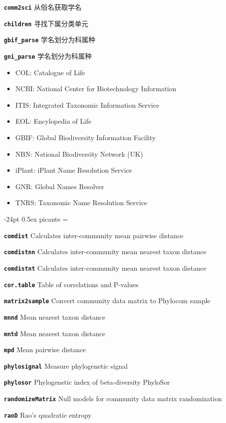 \documentclass[10pt,landscape]{article}
\makeatletter
\renewcommand\section{\@startsection{section}{1}{0mm}%
                                     {-24pt}%
                                     {0.5ex}%
                                {\color{blue}\normalfont\large\bfseries}}
\newcommand{\bcode}[1]{\texttt{\textbf{#1}}}
\makeatother
\begin{document}
\begin{CJK}{UTF8}{gbsn}
\begin{multicols}{3}
\bcode{comm2sci} 从俗名获取学名

\bcode{children} 寻找下属分类单元

\bcode{gbif\_parse} 学名划分为科属种

\bcode{gni\_parse} 学名划分为科属种


\begin{itemize}
\item COL: Catalogue of Life
\item NCBI: National Center for Biotechnology Information
\item ITIS: Integrated Taxonomic Information Service
\item EOL: Encylopedia of Life
\item GBIF: Global Biodiversity Information Facility
\item NBN: National Biodiversity Network (UK)
\item iPlant: iPlant Name Resolution Service
\item GNR: Global Names Resolver
\item TNRS: Taxonomic Name Resolution Service
\end{itemize}

\section{picante}
\everypar={\hangindent=9mm}

\bcode{comdist} Calculates inter-community mean pairwise distance

\bcode{comdistnn}   Calculates inter-community mean nearest taxon distance

\bcode{comdistnt}   Calculates inter-community mean nearest taxon distance

\bcode{cor.table}   Table of correlations and P-values

\bcode{matrix2sample}   Convert community data matrix to Phylocom sample

\bcode{mnnd}    Mean nearest taxon distance

\bcode{mntd}    Mean nearest taxon distance

\bcode{mpd} Mean pairwise distance

\bcode{phylosignal} Measure phylogenetic signal

\bcode{phylosor}    Phylogenetic index of beta-diversity PhyloSor

\bcode{randomizeMatrix} Null models for community data matrix randomization

\bcode{raoD}    Rao's quadratic entropy


\end{multicols}
\end{CJK}
\end{document}
